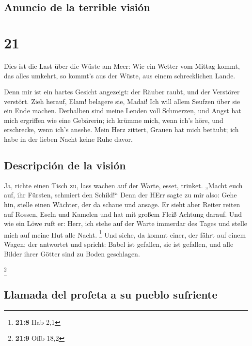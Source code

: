 \hypertarget{anuncio-de-la-terrible-visiuxf3n}{%
\subsection{Anuncio de la terrible
visión}\label{anuncio-de-la-terrible-visiuxf3n}}

\hypertarget{section-20}{%
\section{21}\label{section-20}}

 Dies ist die Last über die Wüste am Meer: Wie ein Wetter
vom Mittag kommt, das alles umkehrt, so kommt's aus der Wüste, aus einem
schrecklichen Lande.

 Denn mir ist ein hartes Gesicht angezeigt: der Räuber
raubt, und der Verstörer verstört. Zieh herauf, Elam! belagere sie,
Madai! Ich will allem Seufzen über sie ein Ende machen. 
Derhalben sind meine Lenden voll Schmerzen, und Angst hat mich ergriffen
wie eine Gebärerin; ich krümme mich, wenn ich's höre, und erschrecke,
wenn ich's ansehe.  Mein Herz zittert, Grauen hat mich
betäubt; ich habe in der lieben Nacht keine Ruhe davor.

\hypertarget{descripciuxf3n-de-la-visiuxf3n}{%
\subsection{Descripción de la
visión}\label{descripciuxf3n-de-la-visiuxf3n}}

 Ja, richte einen Tisch zu, lass wachen auf der Warte,
esset, trinket. „Macht euch auf, ihr Fürsten, schmiert den Schild!{}``
 Denn der HErr sagte zu mir also: Gehe hin, stelle einen
Wächter, der da schaue und ansage.  Er sieht aber Reiter
reiten auf Rossen, Eseln und Kamelen und hat mit großem Fleiß Achtung
darauf.  Und wie ein Löwe ruft er: Herr, ich stehe auf der
Warte immerdar des Tages und stelle mich auf meine Hut alle Nacht.
\footnote{\textbf{21:8} Hab 2,1}  Und siehe, da kommt
einer, der fährt auf einem Wagen; der antwortet und spricht: Babel ist
gefallen, sie ist gefallen, und alle Bilder ihrer Götter sind zu Boden
geschlagen.

\footnote{\textbf{21:9} Offb 18,2}

\hypertarget{llamada-del-profeta-a-su-pueblo-sufriente}{%
\subsection{Llamada del profeta a su pueblo
sufriente}\label{llamada-del-profeta-a-su-pueblo-sufriente}}


